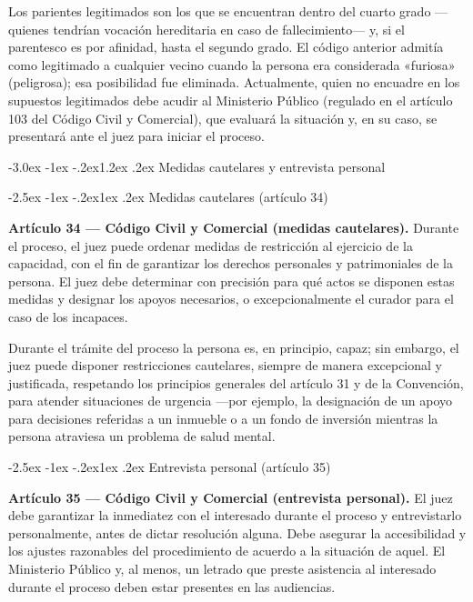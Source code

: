 \documentclass[12pt,oneside]{book}
\makeatletter
\renewcommand\section{\@startsection{section}{1}{\z@}%
  {-3.0ex \@plus -1ex \@minus -.2ex}{1.2ex \@plus .2ex}%
  {\normalfont\large\bfseries\color{acento}}}
\renewcommand\subsection{\@startsection{subsection}{2}{\z@}%
  {-2.5ex \@plus -1ex \@minus -.2ex}{1ex \@plus .2ex}%
  {\normalfont\normalsize\bfseries}}
\makeatother
\begin{document}
Los parientes legitimados son los que se encuentran dentro del cuarto grado ---quienes tendrían vocación hereditaria en caso de fallecimiento--- y, si el parentesco es por afinidad, hasta el segundo grado. El código anterior admitía como legitimado a cualquier vecino cuando la persona era considerada «furiosa» (peligrosa); esa posibilidad fue eliminada. Actualmente, quien no encuadre en los supuestos legitimados debe acudir al Ministerio Público (regulado en el artículo 103 del Código Civil y Comercial), que evaluará la situación y, en su caso, se presentará ante el juez para iniciar el proceso.

\section{Medidas cautelares y entrevista personal}

\subsection{Medidas cautelares (artículo 34)}

\begin{importante}
\textbf{Artículo 34 --- Código Civil y Comercial (medidas cautelares).} Durante el proceso, el juez puede ordenar medidas de restricción al ejercicio de la capacidad, con el fin de garantizar los derechos personales y patrimoniales de la persona. El juez debe determinar con precisión para qué actos se disponen estas medidas y designar los apoyos necesarios, o excepcionalmente el curador para el caso de los incapaces.
\end{importante}

Durante el trámite del proceso la persona es, en principio, capaz; sin embargo, el juez puede disponer restricciones cautelares, siempre de manera excepcional y justificada, respetando los principios generales del artículo 31 y de la Convención, para atender situaciones de urgencia ---por ejemplo, la designación de un apoyo para decisiones referidas a un inmueble o a un fondo de inversión mientras la persona atraviesa un problema de salud mental.

\subsection{Entrevista personal (artículo 35)}

\begin{importante}
\textbf{Artículo 35 --- Código Civil y Comercial (entrevista personal).} El juez debe garantizar la inmediatez con el interesado durante el proceso y entrevistarlo personalmente, antes de dictar resolución alguna. Debe asegurar la accesibilidad y los ajustes razonables del procedimiento de acuerdo a la situación de aquel. El Ministerio Público y, al menos, un letrado que preste asistencia al interesado durante el proceso deben estar presentes en las audiencias.
\end{importante}
\end{document}
